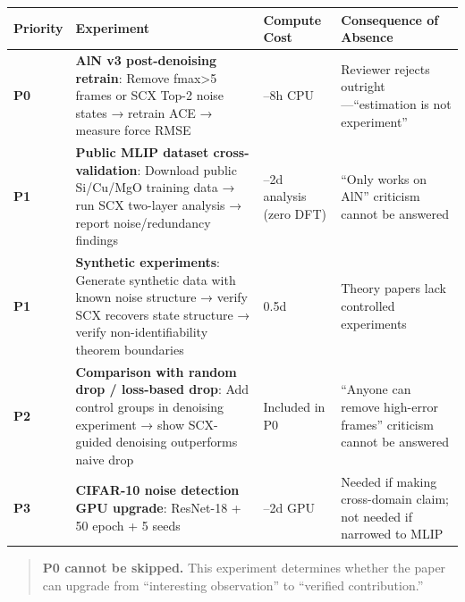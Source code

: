 \documentclass[
  12pt,
]{article}
\begin{document}
\begin{longtable}[]{@{}
  >{\raggedright\arraybackslash}p{}
  >{\raggedright\arraybackslash}p{}
  >{\raggedright\arraybackslash}p{}
  >{\raggedright\arraybackslash}p{}@{}}
\toprule\noalign{}
\begin{minipage}[b]{\linewidth}\raggedright
Priority
\end{minipage} & \begin{minipage}[b]{\linewidth}\raggedright
Experiment
\end{minipage} & \begin{minipage}[b]{\linewidth}\raggedright
Compute Cost
\end{minipage} & \begin{minipage}[b]{\linewidth}\raggedright
Consequence of Absence
\end{minipage} \\
\midrule\noalign{}
\endhead
\bottomrule\noalign{}
\endlastfoot
\textbf{P0} & \textbf{AlN v3 post-denoising retrain}: Remove fmax>5 frames or SCX Top-2 noise states → retrain ACE → measure force RMSE & 4--8h CPU & Reviewer rejects outright---``estimation is not experiment'' \\
\textbf{P1} & \textbf{Public MLIP dataset cross-validation}: Download public Si/Cu/MgO training data → run SCX two-layer analysis → report noise/redundancy findings & 1--2d analysis (zero DFT) & ``Only works on AlN'' criticism cannot be answered \\
\textbf{P1} & \textbf{Synthetic experiments}: Generate synthetic data with known noise structure → verify SCX recovers state structure → verify non-identifiability theorem boundaries & 0.5d & Theory papers lack controlled experiments \\
\textbf{P2} & \textbf{Comparison with random drop / loss-based drop}: Add control groups in denoising experiment → show SCX-guided denoising outperforms naive drop & Included in P0 & ``Anyone can remove high-error frames'' criticism cannot be answered \\
\textbf{P3} & \textbf{CIFAR-10 noise detection GPU upgrade}: ResNet-18 + 50 epoch + 5 seeds & 1--2d GPU & Needed if making cross-domain claim; not needed if narrowed to MLIP \\
\end{longtable}

\begin{quote}
\textbf{P0 cannot be skipped.} This experiment determines whether the paper can upgrade from ``interesting observation'' to ``verified contribution.''
\end{quote}
\end{document}
